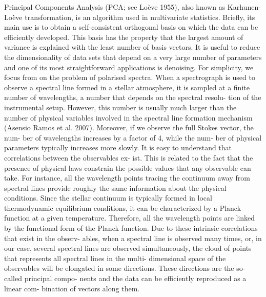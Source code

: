 Principal Components Analysis (PCA; see Loève 1955), also known as
Karhunen-Lo\`ève transformation, is an algorithm used in multivariate statistics.
Briefly, its main use is to obtain a self-consistent orthogonal basis on which 
the data can be efficiently developed. This basis has the property that the 
largest amount of variance is explained with 
the least number of basis vectors. It is useful to reduce the dimensionality of data sets 
that depend on a very large number of parameters and one of its most
straightforward applications is denoising.
For simplicity, we focus from on the problem of polarised spectra. When a spectrograph is used to observe a spectral line formed in a stellar atmosphere, it is sampled at a finite number of wavelengths, a number that depends on the spectral resolu- tion of the instrumental setup. However, this number is usually much larger than the number of physical variables involved in the spectral line formation mechanism (Asensio Ramos et al. 2007). Moreover, if we observe the full Stokes vector, the num- ber of wavelengths increases by a factor of 4, while the num- ber of physical parameters typically increases more slowly. It is easy to understand that correlations between the observables ex- ist. This is related to the fact that the presence of physical laws constrain the possible values that any observable can take. For instance, all the wavelength points tracing the continuum away from spectral lines provide roughly the same information about the physical conditions. Since the stellar continuum is typically formed in local thermodynamic equilibrium conditions, it can be characterized by a Planck function at a given temperature. Therefore, all the wavelength points are linked by the functional form of the Planck function.
Due to these intrinsic correlations that exist in the observ- ables, when a spectral line is observed many times, or, in our case, several spectral lines are observed simultaneously, the cloud of points that represents all spectral lines in the multi- dimensional space of the observables will be elongated in some directions. These directions are the so-called principal compo- nents and the data can be efficiently reproduced as a linear com- bination of vectors along them.

